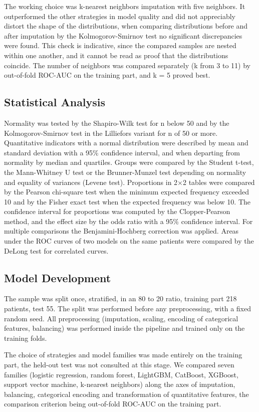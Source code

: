 \documentclass[pdflatex,sn-basic,Numbered]{sn-jnl}
\begin{document}
The working choice was k-nearest neighbors imputation with five neighbors. It outperformed the other strategies in model quality and did not appreciably distort the shape of the distributions, when comparing distributions before and after imputation by the Kolmogorov-Smirnov test no significant discrepancies were found. This check is indicative, since the compared samples are nested within one another, and it cannot be read as proof that the distributions coincide. The number of neighbors was compared separately (k from 3 to 11) by out-of-fold ROC-AUC on the training part, and k = 5 proved best.

\subsection{Statistical Analysis}\label{subsec2_7}

Normality was tested by the Shapiro-Wilk test for n below 50 and by the Kolmogorov-Smirnov test in the Lilliefors variant for n of 50 or more. Quantitative indicators with a normal distribution were described by mean and standard deviation with a 95\% confidence interval, and when departing from normality by median and quartiles. Groups were compared by the Student t-test, the Mann-Whitney U test or the Brunner-Munzel test depending on normality and equality of variances (Levene test). Proportions in 2$\times$2 tables were compared by the Pearson chi-square test when the minimum expected frequency exceeded 10 and by the Fisher exact test when the expected frequency was below 10. The confidence interval for proportions was computed by the Clopper-Pearson method, and the effect size by the odds ratio with a 95\% confidence interval. For multiple comparisons the Benjamini-Hochberg correction was applied. Areas under the ROC curves of two models on the same patients were compared by the DeLong test for correlated curves.

\subsection{Model Development}\label{subsec2_8}

The sample was split once, stratified, in an 80 to 20 ratio, training part 218 patients, test 55. The split was performed before any preprocessing, with a fixed random seed. All preprocessing (imputation, scaling, encoding of categorical features, balancing) was performed inside the pipeline and trained only on the training folds.

The choice of strategies and model families was made entirely on the training part, the held-out test was not consulted at this stage. We compared seven families (logistic regression, random forest, LightGBM, CatBoost, XGBoost, support vector machine, k-nearest neighbors) along the axes of imputation, balancing, categorical encoding and transformation of quantitative features, the comparison criterion being out-of-fold ROC-AUC on the training part.
\end{document}
